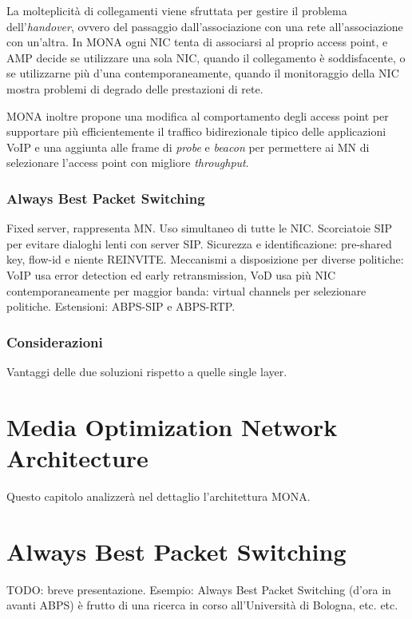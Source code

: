 \documentclass[12pt,a4paper,openright,twoside]{book}
\begin{document}
La molteplicità di collegamenti viene sfruttata per gestire il
problema dell'\emph{handover}, ovvero del passaggio dall'associazione
con una rete all'associazione con un'altra. In MONA ogni NIC tenta di
associarsi al proprio access point, e AMP decide se utilizzare una
sola NIC, quando il collegamento è soddisfacente, o se utilizzarne più
d'una contemporaneamente, quando il monitoraggio della NIC mostra
problemi di degrado delle prestazioni di rete.

MONA inoltre propone una modifica al comportamento degli access point
per supportare più efficientemente il traffico bidirezionale tipico
delle applicazioni VoIP e una aggiunta alle frame di \emph{probe} e
\emph{beacon} per permettere ai MN di selezionare l'access point con
migliore \emph{throughput}.


\subsection{Always Best Packet Switching}

Fixed server, rappresenta MN. Uso simultaneo di tutte le
NIC. Scorciatoie SIP per evitare dialoghi lenti con server
SIP. Sicurezza e identificazione: pre-shared key, flow-id e niente
REINVITE. Meccanismi a disposizione per diverse politiche: VoIP usa
error detection ed early retransmission, VoD usa più NIC
contemporaneamente per maggior banda: virtual channels per selezionare
politiche. Estensioni: ABPS-SIP e ABPS-RTP.


\subsection{Considerazioni}
Vantaggi delle due soluzioni rispetto a quelle single layer.

\clearpage{\pagestyle{empty}\cleardoublepage}


\chapter{Media Optimization Network Architecture}
Questo capitolo analizzerà nel dettaglio l'architettura MONA.

\clearpage{\pagestyle{empty}\cleardoublepage}


\chapter{Always Best Packet Switching}
TODO: breve presentazione. Esempio: Always Best Packet Switching
(d'ora in avanti ABPS) è frutto di una ricerca in corso all'Università
di Bologna, etc. etc.
\end{document}
